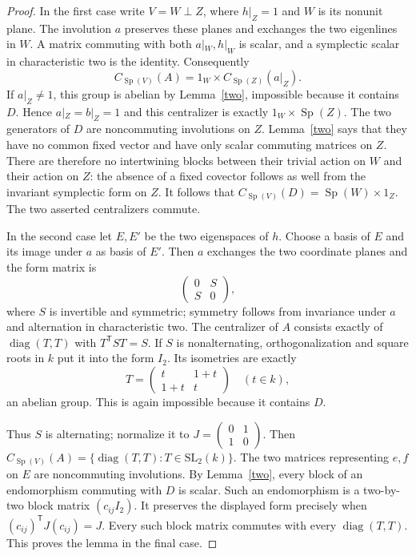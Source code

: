 \documentclass[11pt,a4paper]{article}
\newcommand{\Sp}{\operatorname{Sp}}
\begin{document}
\begin{proof}
In the first case write $V=W\perp Z$, where $h|_Z=1$
and $W$ is its nonunit plane. The involution $a$ preserves these
planes and exchanges the two eigenlines in $W$.
A matrix commuting with both $a|_W,h|_W$ is scalar, and a symplectic
scalar in characteristic two is the identity.
Consequently
\[
 C_{\Sp(V)}(A)=1_W\times C_{\Sp(Z)}(a|_Z).
\]
If $a|_Z\ne1$, this group is abelian by Lemma~\ref{two}, impossible
because it contains $D$. Hence $a|_Z=b|_Z=1$ and this centralizer
is exactly $1_W\times\Sp(Z)$.
The two generators of $D$ are noncommuting involutions on $Z$.
Lemma~\ref{two} says that they have no common fixed vector and have
only scalar commuting matrices on $Z$. There are therefore no
intertwining blocks between their trivial action on $W$ and their
action on $Z$: the absence of a fixed covector follows as well from
the invariant symplectic form on $Z$.
It follows that $C_{\Sp(V)}(D)=\Sp(W)\times1_Z$.
The two asserted centralizers commute.

In the second case let $E,E'$ be the two eigenspaces of $h$.
Choose a basis of $E$ and its image under $a$ as basis of $E'$.
Then $a$ exchanges the two coordinate planes and the form matrix is
\[
                    \begin{pmatrix}0&S\\S&0\end{pmatrix},
\]
where $S$ is invertible and symmetric; symmetry follows from
invariance under $a$ and alternation in characteristic two.
The centralizer of $A$ consists exactly of
$\operatorname{diag}(T,T)$ with $T^{\mathsf T}ST=S$.
If $S$ is nonalternating, orthogonalization and square roots in $k$
put it into the form $I_2$. Its isometries are exactly
\[
             T=\begin{pmatrix}t&1+t\\1+t&t\end{pmatrix}
             \quad(t\in k),
\]
an abelian group. This is again impossible because it contains $D$.

Thus $S$ is alternating; normalize it to
$J=\left(\begin{smallmatrix}0&1\\1&0\end{smallmatrix}\right)$.
Then $C_{\Sp(V)}(A)=\{\operatorname{diag}(T,T):T\in\mathrm{SL}_2(k)\}$.
The two matrices representing $e,f$ on $E$ are noncommuting
involutions. By Lemma~\ref{two}, every block of an endomorphism
commuting with $D$ is scalar. Such an endomorphism is a two-by-two
block matrix $(c_{ij}I_2)$. It preserves the displayed form precisely
when $(c_{ij})^{\mathsf T}J(c_{ij})=J$.
Every such block matrix commutes with every $\operatorname{diag}(T,T)$.
This proves the lemma in the final case.
\end{proof}
\end{document}
